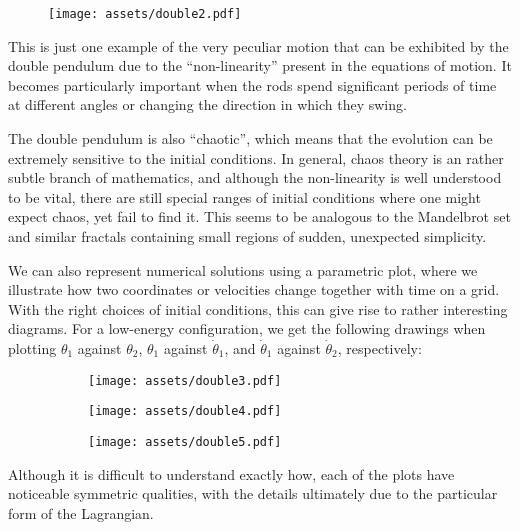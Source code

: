\documentclass[11pt]{article}
\begin{document}
\begin{figure}[htbp]
\centering
\texttt{[image: assets/double2.pdf]}
\label{plot:double2}
\end{figure}
\newpage

This is just one example of the very peculiar motion that can be exhibited by the double pendulum due to the ``non\hyp{}linearity'' present in the equations of motion. It becomes particularly important when the rods spend significant periods of time at different angles or changing the direction in which they swing. \newline

The double pendulum is also ``chaotic'', which means that the evolution can be extremely sensitive to the initial conditions. In general, chaos theory is an rather subtle branch of mathematics, and although the non\hyp{}linearity is well understood to be vital, there are still special ranges of initial conditions where one might expect chaos, yet fail to find it. This seems to be analogous to the Mandelbrot set and similar fractals containing small regions of sudden, unexpected simplicity.
\newline

We can also represent numerical solutions using a parametric plot, where we illustrate how two coordinates or velocities change together with time on a grid. With the right choices of initial conditions, this can give rise to rather interesting diagrams. For a low\hyp{}energy configuration, we get the following drawings when plotting $\theta_1$ against $\theta_2$, $\theta_1$ against $\dot{\theta}_1$, and $\dot{\theta}_1$ against $\dot{\theta}_2$, respectively:

\begin{figure}[htbp]
\centering
\begin{subfigure}{110pt}
\texttt{[image: assets/double3.pdf]}
\end{subfigure}
\begin{subfigure}{110pt}
\texttt{[image: assets/double4.pdf]}
\end{subfigure}
\begin{subfigure}{110pt}
\texttt{[image: assets/double5.pdf]}
\end{subfigure}
\label{plot:double3}
\end{figure}

Although it is difficult to understand exactly how, each of the plots have noticeable symmetric qualities, with the details ultimately due to the particular form of the Lagrangian.
\newpage
\end{document}
